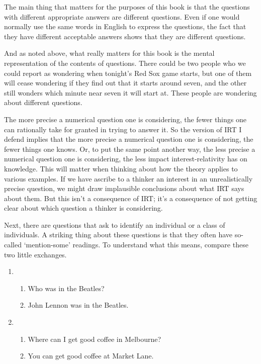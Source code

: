 \documentclass[11pt,]{book}
\providecommand{\tightlist}{%
  \setlength{\itemsep}{0pt}\setlength{\parskip}{0pt}}
\begin{document}
The main thing that matters for the purposes of this book is that the questions with different appropriate answers are different questions. Even if one would normally use the same words in English to express the questions, the fact that they have different acceptable answers shows that they are different questions.

And as noted above, what really matters for this book is the mental representation of the contents of questions. There could be two people who we could report as wondering when tonight's Red Sox game starts, but one of them will cease wondering if they find out that it starts around seven, and the other still wonders which minute near seven it will start at. These people are wondering about different questions.

The more precise a numerical question one is considering, the fewer things one can rationally take for granted in trying to answer it. So the version of IRT I defend implies that the more precise a numerical question one is considering, the fewer things one knows. Or, to put the same point another way, the less precise a numerical question one is considering, the less impact interest-relativity has on knowledge. This will matter when thinking about how the theory applies to various examples. If we have ascribe to a thinker an interest in an unrealistically precise question, we might draw implausible conclusions about what IRT says about them. But this isn't a consequence of IRT; it's a consequence of not getting clear about which question a thinker is considering.

Next, there are questions that ask to identify an individual or a class of individuals. A striking thing about these questions is that they often have so-called `mention-some' readings. To understand what this means, compare these two little exchanges.

\begin{enumerate}
\def\labelenumi{\arabic{enumi}.}
\item
  \begin{enumerate}
  \def\labelenumii{\alph{enumii}.}
  \tightlist
  \item
    Who was in the Beatles?
  \item
    John Lennon was in the Beatles.
  \end{enumerate}
\item
  \begin{enumerate}
  \def\labelenumii{\alph{enumii}.}
  \tightlist
  \item
    Where can I get good coffee in Melbourne?
  \item
    You can get good coffee at Market Lane.
  \end{enumerate}
\end{enumerate}
\end{document}
